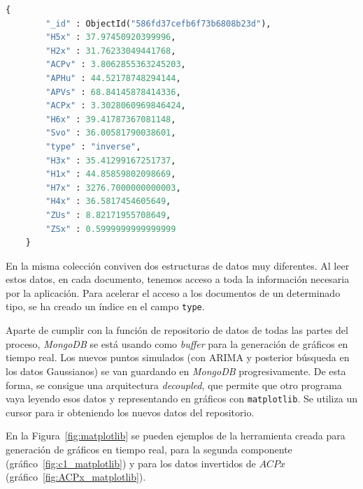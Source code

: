 \documentclass[11pt,spanish,listoffigures,listoftables]{tfgetsinf}
\begin{document}
        \begin{lstlisting}[language=Python, caption=Documento de tipo {\tt inverse}., label={lst:generated_inverse}]
    {
        "_id" : ObjectId("586fd37cefb6f73b6808b23d"),
        "H5x" : 37.97450920399996,
        "H2x" : 31.76233049441768,
        "ACPv" : 3.8062855363245203,
        "APHu" : 44.52178748294144,
        "APVs" : 68.84145878414336,
        "ACPx" : 3.3028060969846424,
        "H6x" : 39.41787367081148,
        "Svo" : 36.00581790038601,
        "type" : "inverse",
        "H3x" : 35.41299167251737,
        "H1x" : 44.85859802098669,
        "H7x" : 3276.7000000000003,
        "H4x" : 36.5817454605649,
        "ZUs" : 8.82171955708649,
        "ZSx" : 0.5999999999999999
    }
        \end{lstlisting}
        
        En la misma colección conviven dos estructuras de datos muy diferentes. Al leer estos datos, en cada documento, tenemos acceso a toda la información necesaria por la aplicación. Para acelerar el acceso a los documentos de un determinado tipo, se ha creado un índice en el campo {\tt type}.
        
        Aparte de cumplir con la función de repositorio de datos de todas las partes del proceso, {\em MongoDB} se está usando como {\em buffer} para la generación de gráficos en tiempo real. Los nuevos puntos simulados (con ARIMA y posterior búsqueda en los datos Gaussianos) se van guardando en {\em MongoDB} progresivamente. De esta forma, se consigue una arquitectura {\em decoupled}, que permite que otro programa vaya leyendo esos datos y representando en gráficos con {\tt matplotlib}. Se utiliza un cursor para ir obteniendo los nuevos datos del repositorio.
        
        En la Figura~\ref{fig:matplotlib} se pueden ejemplos de la herramienta creada para generación de gráficos en tiempo real, para la segunda componente (gráfico~\ref{fig:c1_matplotlib}) y para los datos invertidos de \(ACPx\) (gráfico~\ref{fig:ACPx_matplotlib}). 
        
\end{document}
